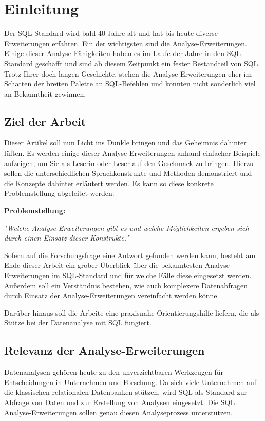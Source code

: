 \chapter{Einleitung}
Der SQL-Standard wird bald 40 Jahre alt und hat bis heute diverse
Erweiterungen erfahren. Ein der wichtigsten sind die Analyse-Erweiterungen. Einige
dieser Analyse-Fähigkeiten haben es im Laufe der Jahre in den SQL-Standard
geschafft und sind ab diesem Zeitpunkt ein fester Bestandteil von SQL. Trotz Ihrer doch
langen Geschichte, stehen die Analyse-Erweiterungen eher im Schatten der breiten
Palette an SQL-Befehlen und konnten nicht sonderlich viel an Bekanntheit gewinnen.


\section{Ziel der Arbeit}
Dieser Artikel soll nun Licht ins Dunkle bringen und das Geheimnis dahinter lüften.
Es werden einige dieser Analyse-Erweiterungen anhand einfacher Beispiele aufzeigen,
um Sie als Leserin oder Leser auf den Geschmack zu bringen. Hierzu sollen die
unterschiedlichen Sprachkonstrukte und Methoden demonstriert und die Konzepte
dahinter erläutert werden. Es kann so diese konkrete Problemstellung abgeleitet
werden:

\textbf{Problemstellung:}
\begin{center}
    \textit{"Welche Analyse-Erweiterungen gibt es und welche Möglichkeiten ergeben sich durch
    einen Einsatz dieser Konstrukte."}
\end{center}

Sofern auf die Forschungsfrage eine Antwort gefunden werden kann, besteht am Ende
dieser Arbeit ein grober Überblick über die bekanntesten Analyse-Erweiterungen im
SQL-Standard und für welche Fälle diese eingesetzt werden. Außerdem soll
ein Verständnis bestehen, wie auch komplexere Datenabfragen durch Einsatz der
Analyse-Erweiterungen vereinfacht werden könne.

Darüber hinaus soll die Arbeite eine praxisnahe Orientierungshilfe liefern, die als
Stütze bei der Datenanalyse mit SQL fungiert.


\section{Relevanz der Analyse-Erweiterungen}
Datenanalysen gehören heute zu den unverzichtbaren Werkzeugen für Entscheidungen
in Unternehmen und Forschung. Da sich viele Unternehmen auf die klassischen
relationalen Datenbanken stützen, wird SQL als Standard zur Abfrage von Daten und
zur Erstellung von Analysen eingesetzt. Die SQL Analyse-Erweiterungen sollen genau
diesen Analyseprozess unterstützen.

